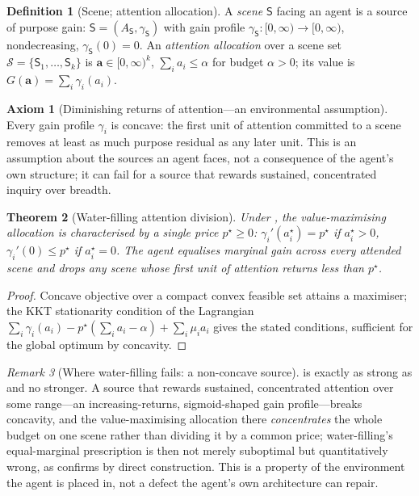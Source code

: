 \documentclass[11pt,twocolumn,a4paper]{article}
\theoremstyle{frathm}
\newtheorem{theorem}{Theorem}[section]
\theoremstyle{definition}
\newtheorem{definition}[theorem]{Definition}
\newtheorem{axiom}{Axiom}
\theoremstyle{remark}
\newtheorem{remark}[theorem]{Remark}
\newcommand{\Scene}{\mathsf{S}}
\newcommand{\scenes}{\mathcal{S}}
\newcommand{\price}{p^{\star}}
\newcommand{\alloc}{\mathbf{a}}
\newcommand{\att}{\alpha}
\begin{document}
\begin{definition}[Scene; attention allocation]
\label{def:scene}
A \emph{scene} $\Scene$ facing an agent is a source of purpose gain:
$\Scene=(A_\Scene,\gamma_\Scene)$ with gain profile $\gamma_\Scene:
[0,\infty)\to[0,\infty)$, nondecreasing, $\gamma_\Scene(0)=0$. An
\emph{attention allocation} over a scene set $\scenes=\{\Scene_1,\dots,
\Scene_k\}$ is $\alloc\in[0,\infty)^k$, $\sum_i a_i\le\att$ for budget
$\att>0$; its value is $G(\alloc)=\sum_i\gamma_i(a_i)$.
\end{definition}

\begin{axiom}[Diminishing returns of attention---an environmental
assumption]
\label{ax:concave}
Every gain profile $\gamma_i$ is concave: the first unit of attention
committed to a scene removes at least as much purpose residual as any
later unit. This is an assumption about the sources an agent faces, not
a consequence of the agent's own structure; it can fail for a source
that rewards sustained, concentrated inquiry over breadth.
\end{axiom}

\begin{theorem}[Water-filling attention division]
\label{thm:waterfill}
Under , the value-maximising allocation is
characterised by a single price $\price\ge0$: $\gamma_i'(a_i^{\star})
=\price$ if $a_i^{\star}>0$, $\gamma_i'(0)\le\price$ if $a_i^{\star}=0$.
The agent equalises marginal gain across every attended scene and drops
any scene whose first unit of attention returns less than $\price$.
\end{theorem}

\begin{proof}
Concave objective over a compact convex feasible set attains a maximiser;
the KKT stationarity condition of the Lagrangian
$\sum_i\gamma_i(a_i)-\price(\sum_i a_i-\att)+\sum_i\mu_i a_i$ gives the
stated conditions, sufficient for the global optimum by concavity.
\end{proof}

\begin{remark}[Where water-filling fails: a non-concave source]
\label{rem:nonconcave}
 is exactly as strong as  and no
stronger. A source that rewards sustained, concentrated attention over
some range---an increasing-returns, sigmoid-shaped gain profile---breaks
concavity, and the value-maximising allocation there \emph{concentrates}
the whole budget on one scene rather than dividing it by a common price;
water-filling's equal-marginal prescription is then not merely
suboptimal but quantitatively wrong, as 
confirms by direct construction. This is a property of the environment
the agent is placed in, not a defect the agent's own architecture can
repair.
\end{remark}
\end{document}
